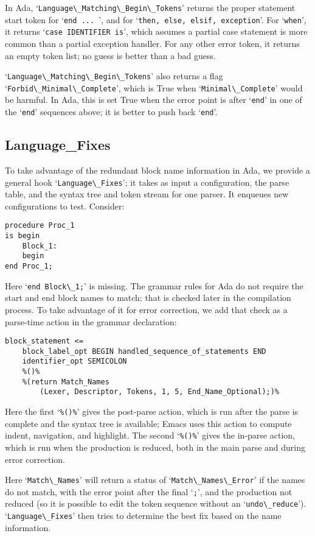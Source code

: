 \documentclass{article}
\newcommand{\code}[1]{`\lstinline|#1|'}
\begin{document}
In Ada, \code{Language\_Matching\_Begin\_Tokens} returns the proper
statement start token for \code{end ... }, and for
\code{then, else, elsif, exception}. For \code{when}, it returns
\code{case IDENTIFIER is}, which assumes a partial case statement is
more common than a partial exception handler. For any other error
token, it returns an empty token list; no guess is better than a bad
guess.

\code{Language\_Matching\_Begin\_Tokens} also returns a flag\\
\code{Forbid\_Minimal\_Complete}, which is True when
\code{Minimal\_Complete} would be harmful. In Ada, this is set True
when the error point is after \code{end} in one of the \code{end}
sequences above; it is better to push back \code{end}.

\subsection{Language\_Fixes}
To take advantage of the redundant block name information in Ada, we
provide a general hook \code{Language\_Fixes}; it takes as input a
configuration, the parse table, and the syntax tree and token stream
for one parser. It enqueues new configurations to test. Consider:
\begin{lstlisting}
procedure Proc_1
is begin
    Block_1:
    begin
end Proc_1;
\end{lstlisting}
Here \code{end Block\_1;} is missing. The grammar rules for Ada do not
require the start and end block names to match; that is checked later
in the compilation process. To take advantage of it for error
correction, we add that check as a parse-time action in the grammar
declaration:
\begin{verbatim}
block_statement <=
    block_label_opt BEGIN handled_sequence_of_statements END
    identifier_opt SEMICOLON
    %()%
    %(return Match_Names
        (Lexer, Descriptor, Tokens, 1, 5, End_Name_Optional);)%
\end{verbatim}
Here the first `\verb|%()%|' gives the post-parse action, which is run
after the parse is complete and the syntax tree is available; Emacs
uses this action to compute indent, navigation, and highlight. The
second `\verb|%()%|' gives the in-parse action, which is run when the
production is reduced, both in the main parse and during error
correction.

Here \code{Match\_Names} will return a status of
\code{Match\_Names\_Error} if the names do not match, with the error
point after the final \code{;}, and the production not reduced (so it
is possible to edit the token sequence without an
\code{undo\_reduce}). \code{Language\_Fixes} then tries to determine
the best fix based on the name information.
\end{document}
